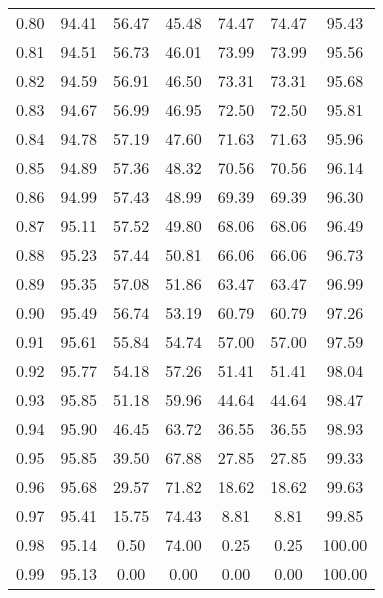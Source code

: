 \begin{tabular}{|c|c|c|c|c|c|c|}
      0.80 &     94.41 &     56.47 &      45.48 &   74.47 &      74.47 &         95.43 \\
      0.81 &     94.51 &     56.73 &      46.01 &   73.99 &      73.99 &         95.56 \\
      0.82 &     94.59 &     56.91 &      46.50 &   73.31 &      73.31 &         95.68 \\
      0.83 &     94.67 &     56.99 &      46.95 &   72.50 &      72.50 &         95.81 \\
      0.84 &     94.78 &     57.19 &      47.60 &   71.63 &      71.63 &         95.96 \\
      0.85 &     94.89 &     57.36 &      48.32 &   70.56 &      70.56 &         96.14 \\
      0.86 &     94.99 &     57.43 &      48.99 &   69.39 &      69.39 &         96.30 \\
      0.87 &     95.11 &     57.52 &      49.80 &   68.06 &      68.06 &         96.49 \\
      0.88 &     95.23 &     57.44 &      50.81 &   66.06 &      66.06 &         96.73 \\
      0.89 &     95.35 &     57.08 &      51.86 &   63.47 &      63.47 &         96.99 \\
      0.90 &     95.49 &     56.74 &      53.19 &   60.79 &      60.79 &         97.26 \\
      0.91 &     95.61 &     55.84 &      54.74 &   57.00 &      57.00 &         97.59 \\
      0.92 &     95.77 &     54.18 &      57.26 &   51.41 &      51.41 &         98.04 \\
      0.93 &     95.85 &     51.18 &      59.96 &   44.64 &      44.64 &         98.47 \\
      0.94 &     95.90 &     46.45 &      63.72 &   36.55 &      36.55 &         98.93 \\
      0.95 &     95.85 &     39.50 &      67.88 &   27.85 &      27.85 &         99.33 \\
      0.96 &     95.68 &     29.57 &      71.82 &   18.62 &      18.62 &         99.63 \\
      0.97 &     95.41 &     15.75 &      74.43 &    8.81 &       8.81 &         99.85 \\
      0.98 &     95.14 &      0.50 &      74.00 &    0.25 &       0.25 &        100.00 \\
      0.99 &     95.13 &      0.00 &       0.00 &    0.00 &       0.00 &        100.00 \\
\bottomrule
\end{tabular}
